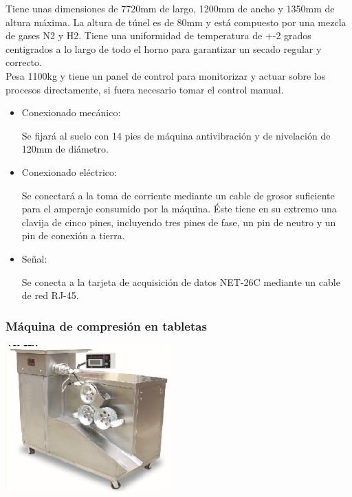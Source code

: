 	Tiene unas dimensiones de 7720mm de largo, 1200mm de ancho y 1350mm de altura máxima. La altura de túnel es de 80mm y está compuesto por una mezcla de gases N2 y H2. Tiene una uniformidad de temperatura de +-2 grados centigrados a lo largo de todo el horno para garantizar un secado regular y correcto.\\

	Pesa 1100kg y tiene un panel de control para monitorizar y actuar sobre los procesos directamente, si fuera necesario tomar el control manual.

		\begin{itemize}
				\item{Conexionado mecánico:}
				
				Se fijará al suelo con 14 pies de máquina antivibración y de nivelación de 120mm de diámetro.

				\item{Conexionado eléctrico:}

				Se conectará a la toma de corriente mediante un cable de grosor suficiente para el amperaje consumido por la máquina. Éste tiene en su extremo una clavija de cinco pines, incluyendo tres pines de fase, un pin de neutro y un pin de conexión a tierra.  
				
				\item{Señal:}

				Se conecta a la tarjeta de acquisición de datos NET-26C mediante un cable de red RJ-45.
				
		\end{itemize}

	\newpage

	\subsubsection{Máquina de compresión en tabletas}

	\includegraphics[scale=1]{Datasheets/2MaquinaPrensadoFoto.png}


